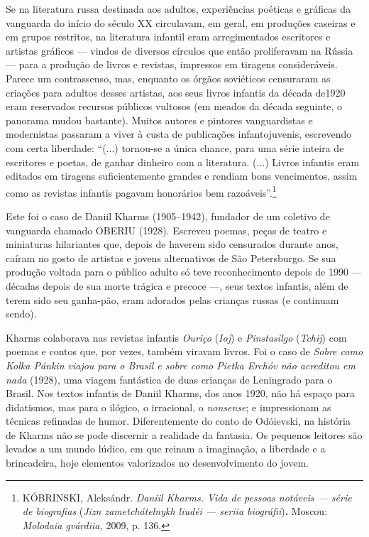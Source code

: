 Se na literatura russa destinada aos adultos, experiências poéticas e
gráficas da vanguarda do início do século XX circulavam, em geral, em
produções caseiras e em grupos restritos, na literatura infantil eram
arregimentados escritores e artistas gráficos --- vindos de diversos
círculos que então proliferavam na Rússia --- para a produção de livros
e revistas, impressos em tiragens consideráveis. Parece um contrassenso,
mas, enquanto os órgãos soviéticos censuraram as criações para adultos
desses artistas, aos seus livros infantis da década de1920 eram
reservados recursos públicos vultosos (em meados da década seguinte, o
panorama mudou bastante). Muitos autores e pintores vanguardistas e
modernistas passaram a viver à custa de publicações infantojuvenis,
escrevendo com certa liberdade: ``(...) tornou-se a única chance, para
uma série inteira de escritores e poetas, de ganhar dinheiro com a
literatura. (...) Livros infantis eram editados em tiragens
suficientemente grandes e rendiam bons vencimentos, assim como as
revistas infantis pagavam honorários bem razoáveis''.\footnote{KÓBRINSKI,
  Aleksándr. \emph{Daniil Kharms. Vida de pessoas notáveis --- série de
  biografias} (\emph{Jizn zametchátelnykh liudéi --- seriia
  biográfii})\textbf{.} Moscou: \emph{Molodaia gvárdiia,} 2009, p. 136.}

Este foi o caso de Daniil Kharms (1905--1942), fundador de um coletivo
de vanguarda chamado OBERIU (1928). Escreveu poemas, peças de teatro e
miniaturas hilariantes que, depois de haverem sido censurados durante
anos, caíram no gosto de artistas e jovens alternativos de São
Petersburgo. Se sua produção voltada para o público adulto só teve
reconhecimento depois de 1990 --- décadas depois de sua morte trágica e
precoce ---, seus textos infantis, além de terem sido seu ganha-pão,
eram adorados pelas crianças russas (e continuam sendo).

Kharms colaborava nas revistas infantis \emph{Ouriço} (\emph{Ioj}) e
\emph{Pinstasilgo} (\emph{Tchij}) com poemas e contos que, por vezes,
também viravam livros. Foi o caso de \emph{Sobre como Kolka Pánkin
viajou para o Brasil e sobre como Pietka Erchóv não acreditou em nada}
(1928), uma viagem fantástica de duas crianças de Leningrado para o
Brasil. Nos textos infantis de Daniil Kharms, dos anos 1920, não há
espaço para didatismos, mas para o ilógico, o irracional, o
\emph{nonsense}; e impressionam as técnicas refinadas de humor.
Diferentemente do conto de Odóievski, na história de Kharms não se pode
discernir a realidade da fantasia. Os pequenos leitores são levados a um
mundo lúdico, em que reinam a imaginação, a liberdade e a brincadeira,
hoje elementos valorizados no desenvolvimento do jovem.

